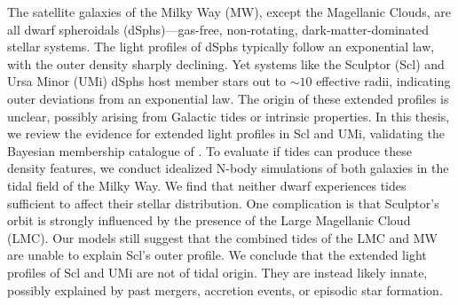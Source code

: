 The satellite galaxies of the Milky Way (MW), except the Magellanic
Clouds, are all dwarf spheroidals (dSphs)---gas-free, non-rotating,
dark-matter-dominated stellar systems. The light profiles of dSphs
typically follow an exponential law, with the outer density sharply
declining. Yet systems like the Sculptor (Scl) and Ursa Minor (UMi)
dSphs host member stars out to \(\sim10\) effective radii, indicating
outer deviations from an exponential law. The origin of these extended
profiles is unclear, possibly arising from Galactic tides or intrinsic
properties. In this thesis, we review the evidence for extended light
profiles in Scl and UMi, validating the Bayesian membership catalogue of
\citet{jensen+2024}. To evaluate if tides can produce these density
features, we conduct idealized N-body simulations of both galaxies in
the tidal field of the Milky Way. We find that neither dwarf experiences
tides sufficient to affect their stellar distribution. One complication
is that Sculptor's orbit is strongly influenced by the presence of the
Large Magellanic Cloud (LMC). Our models still suggest that the combined
tides of the LMC and MW are unable to explain Scl's outer profile. We
conclude that the extended light profiles of Scl and UMi are not of
tidal origin. They are instead likely innate, possibly explained by past
mergers, accretion events, or episodic star formation.
